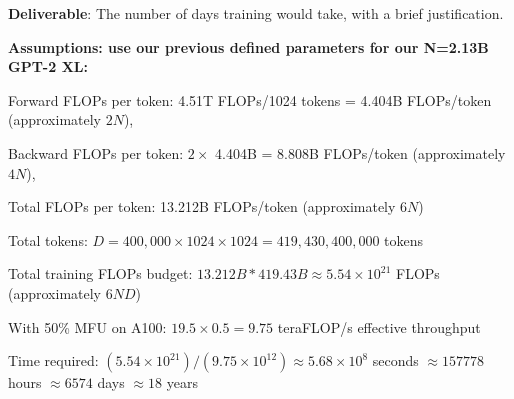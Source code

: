 \begin{enumerate}[label=(\alph*)]
    \textbf{Deliverable}: The number of days training would take, with a brief justification.

    \begin{answer}
    \textbf{Assumptions: use our previous defined parameters for our N=2.13B GPT-2 XL:}
    
    Forward FLOPs per token: 4.51T FLOPs/1024 tokens = 4.404B FLOPs/token (approximately $2N$), 

    Backward FLOPs per token: $2 \times$ 4.404B = 8.808B FLOPs/token (approximately $4N$),

    Total FLOPs per token: 13.212B FLOPs/token (approximately $6N$)

    Total tokens: $D = 400,000 \times 1024 \times 1024 = 419,430,400,000$ tokens

    Total training FLOPs budget: $13.212B * 419.43B \approx 5.54 \times 10^{21}$ FLOPs (approximately $6ND$)

    With 50\% MFU on A100: $19.5 \times 0.5 = 9.75$ teraFLOP/s effective throughput

    Time required: $(5.54 \times 10^{21}) / (9.75 \times 10^{12}) \approx 5.68 \times 10^{8}$ seconds $\approx 157778$ hours  $\approx 6574$ days $\approx 18$ years
    \end{answer}
\end{enumerate}

